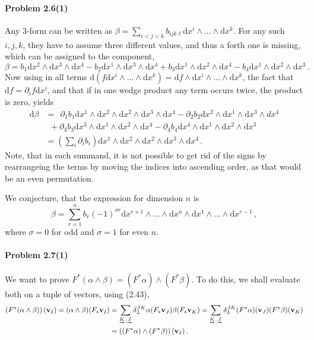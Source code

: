 \documentclass[a4paper,12pt]{article}
\def\d{\mathrm{d}}
\newcommand{\problem}[1]{\paragraph{Problem #1}}
\begin{document}
\problem{2.6(1)} Any 3-form can be written as $\beta = \sum_{i<j<k}b_{ijk\ell}\d x^i \wedge \dots \wedge \d x^k$. For any such $i,j,k$, they have to assume three different values, and thus a forth one is missing, which can be assigned to the component,
\[
 \beta = b_1 \d x^2 \wedge \d x^3 \wedge \d x^4 - b_2 \d x^1 \wedge \d x^3 \wedge \d x^4 + b_3 \d x^1 \wedge \d x^2 \wedge \d x^4 - b_4 \d x^1 \wedge \d x^2 \wedge \d x^3\,.
\]
Now using in all terms $\d (f \d x^i \wedge \dots\wedge \d x^k) = \d f \wedge \d x^i \wedge \dots \wedge \d x^k$, the fact that $\d f = \partial_i f \d x^i$, and that if in one wedge product any term occurs twice, the product is zero, yields
\[
 \begin{aligned}
 \d \beta &= 
  \ \ \partial_1 b_1 \d x^1 \wedge \d x^2 \wedge \d x^2 \wedge \d x^3 \wedge \d x^4 - \partial_2 b_2 \d x^2 \wedge \d x^1 \wedge \d x^3 \wedge d x^4\\
  &\ \ + \partial_3 b_3 \d x^3 \wedge \d x^1 \wedge \d x^2 \wedge \d x^4 - \partial_4 b_4 \d x^4 \wedge \d x^1 \wedge \d x^2 \wedge \d x^3\\
  &= \left(\sum_i \partial_i b_i\right)\d x^1 \wedge \d x^2 \wedge \d x^2 \wedge \d x^3 \wedge \d x^4\,.
 \end{aligned}
\]
Note, that in each summand, it is not possible to get rid of the signs by rearrangeing the terms by moving the indices into ascending order, as that would be an even permutation.

We conjecture, that the expression for dimension $n$ is
\[
 \beta = \sum_{r=1}^n b_r (-1)^{\sigma r}\d x^{r+1}\wedge\dots\wedge \d x^n \wedge \d x^1 \wedge \dots \wedge \d x^{r-1}\,,
\]
where $\sigma = 0$ for odd and $\sigma=1$ for even $n$.


\problem{2.7(1)} We want to prove $F^*(\alpha \wedge \beta) = (F^*\alpha)\wedge (F^*\beta)$. To do this, we shall evaluate both on a tuple of vectors, using (2.43),
\[
\begin{aligned}
 \left(F^*(\alpha \wedge \beta)\right)({\bf v}_I) =
 (\alpha\wedge\beta)({F_*\bf v}_I) &=
  \sum_{\underrightarrow{K}, \underrightarrow{J}}\delta^{JK}_L \alpha({F_*\bf v}_J)\beta({F_*\bf v}_K) = \sum_{\underrightarrow{K}, \underrightarrow{J}}\delta^{JK}_L (F^*\alpha)({\bf v}_J)(F^*\beta)({\bf v}_K)\\ &= \left((F^*\alpha)\wedge(F^*\beta)\right)({\bf v}_I)\,.
\end{aligned}
\]
\end{document}
